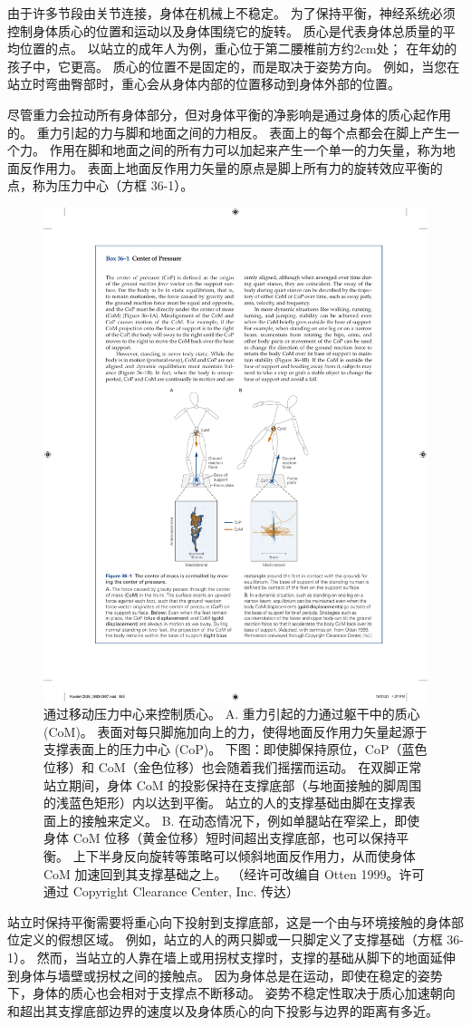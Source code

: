 由于许多节段由关节连接，身体在机械上不稳定。
为了保持平衡，神经系统必须控制身体质心的位置和运动以及身体围绕它的旋转。
质心是代表身体总质量的平均位置的点。
以站立的成年人为例，重心位于第二腰椎前方约2cm处； 在年幼的孩子中，它更高。
质心的位置不是固定的，而是取决于姿势方向。
例如，当您在站立时弯曲臀部时，重心会从身体内部的位置移动到身体外部的位置。


尽管重力会拉动所有身体部分，但对身体平衡的净影响是通过身体的质心起作用的。
重力引起的力与脚和地面之间的力相反。
表面上的每个点都会在脚上产生一个力。
作用在脚和地面之间的所有力可以加起来产生一个单一的力矢量，称为地面反作用力。
表面上地面反作用力矢量的原点是脚上所有力的旋转效应平衡的点，称为压力中心（方框 36-1）。


\begin{figure}[htbp]
	\centering
	\includegraphics[width=0.6\linewidth]{chap36/fig_36_1}
	\caption{通过移动压力中心来控制质心。 A. 重力引起的力通过躯干中的质心 (CoM)。 表面对每只脚施加向上的力，使得地面反作用力矢量起源于支撑表面上的压力中心 (CoP)。 下图：即使脚保持原位，CoP（蓝色位移）和 CoM（金色位移）也会随着我们摇摆而运动。 在双脚正常站立期间，身体 CoM 的投影保持在支撑底部（与地面接触的脚周围的浅蓝色矩形）内以达到平衡。 站立的人的支撑基础由脚在支撑表面上的接触来定义。 B. 在动态情况下，例如单腿站在窄梁上，即使身体 CoM 位移（黄金位移）短时间超出支撑底部，也可以保持平衡。 上下半身反向旋转等策略可以倾斜地面反作用力，从而使身体 CoM 加速回到其支撑基础之上。 （经许可改编自 Otten 1999。许可通过 Copyright Clearance Center, Inc. 传达）}
	\label{fig:36_1}
\end{figure}


站立时保持平衡需要将重心向下投射到支撑底部，这是一个由与环境接触的身体部位定义的假想区域。
例如，站立的人的两只脚或一只脚定义了支撑基础（方框 36-1）。
然而，当站立的人靠在墙上或用拐杖支撑时，支撑的基础从脚下的地面延伸到身体与墙壁或拐杖之间的接触点。
因为身体总是在运动，即使在稳定的姿势下，身体的质心也会相对于支撑点不断移动。
姿势不稳定性取决于质心加速朝向和超出其支撑底部边界的速度以及身体质心的向下投影与边界的距离有多近。


